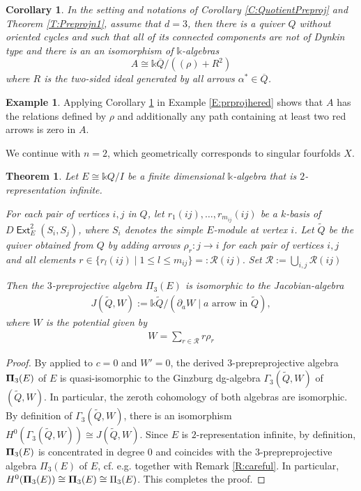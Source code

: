 \documentclass[a4paper,11pt, reqno]{amsart}
\newcommand{\opname}[1]{\operatorname{\mathsf{#1}}}
\newcommand{\Ext}{\opname{Ext}}
\theoremstyle{plain}
\newtheorem{theorem}[dummy]{Theorem}
\newtheorem{corollary}[dummy]{Corollary}
\theoremstyle{definition}
\newtheorem{example}[dummy]{Example}
\numberwithin{equation}{section}
\newlength{\arrow}
\begin{document}
\begin{corollary}\label{C:QuotientPreproj2}
    In the setting and notations of Corollary \ref{C:QuotientPreproj} and Theorem \ref{T:Preprojn1}, assume that $d=3$, then there is a quiver $Q$ without oriented cycles and such that all of its connected components are not of Dynkin type and there is an an isomorphism of $\mathbb{k}$-algebras \[A \cong \mathbb{k}\overline{Q}/((\rho) + R^2)\]
    where $R$ is the two-sided ideal generated by all arrows $\alpha^* \in \overline{Q}$.
\end{corollary}

\begin{example}
    Applying Corollary \ref{C:QuotientPreproj2} in Example \ref{E:prprojhered} shows that $A$ has the relations defined by $\rho$ and additionally any path containing at least two red arrows is zero in $A$. 
\end{example}

We continue with $n=2$, which geometrically corresponds to singular fourfolds $X$. 

\begin{theorem}\label{thm:3preproj}
    Let $E\cong \mathbb{k}Q/I$ be a finite dimensional $\mathbb{k}$-algebra that is $2$-representation infinite. 
    
    For each pair of vertices $i, j$ in $Q$, let $r_{1}(ij), \ldots, r_{m_{ij}}(ij)$ be a $k$-basis of $D\Ext^2_E(S_i, S_j)$, where $S_i$ denotes the simple $E$-module at vertex $i$. Let $\widetilde{Q}$ be the quiver obtained from $Q$ by adding arrows $\rho_r\colon j \to i$ for each pair of vertices $i, j$ and all elements $r \in \{r_l(ij)\mid 1 \leq l \leq m_{ij}\}=:\mathcal{R}(ij).$ Set $\mathcal{R}:= \bigcup_{i, j} \mathcal{R}(ij)$ 

    Then the $3$-preprojective algebra $\Pi_3(E)$ is isomorphic to the Jacobian-algebra \begin{align}
        J(\widetilde{Q},W) :=\mathbb{k}\widetilde{Q}/(\partial_a W \mid a \text{ arrow in } \widetilde{Q}),
            \end{align}
   where $W$ is the potential given by
   \begin{align}
       W=\sum_{r \in \mathcal{R}} r\rho_r
   \end{align}
    
\end{theorem}
\begin{proof}
    By \cite[Section 6.9 \& Theorem 6.10]{KellerCY} applied to $c=0$ and $W'=0$, the derived $3$-prepreprojective algebra ${\bf\Pi}_3(E)$ of $E$ is quasi-isomorphic to the Ginzburg dg-algebra $\Gamma_3(\widetilde{Q}, W)$ of $(\widetilde{Q}, W)$. In particular, the zeroth cohomology of both algebras are isomorphic.
    By definition of $\Gamma_3(\widetilde{Q}, W)$, there is an isomorphism $H^0(\Gamma_3(\widetilde{Q}, W)) \cong J(\widetilde{Q}, W)$. Since $E$ is $2$-representation infinite, by definition, ${\bf\Pi}_3(E)$ is concentrated in degree $0$ and coincides with 
    the $3$-prepreprojective algebra ${\Pi}_3(E)$ of $E$, cf. e.g. \cite[Part (ii) of proof of Theorem 4.36]{HIO} together with Remark \ref{R:careful}. In particular,
     $H^0({\bf\Pi}_3(E)) \cong {\bf\Pi}_3(E) \cong \Pi_3(E)$. This completes the proof.
\end{proof}
\end{document}
